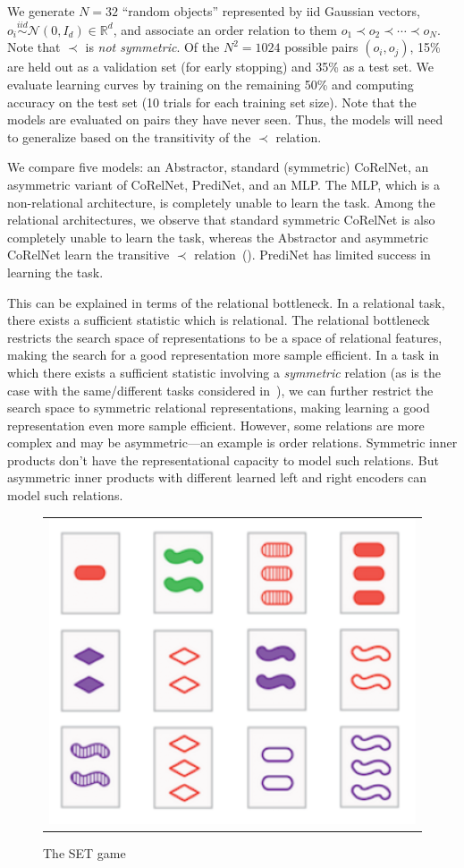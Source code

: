 We generate $N = 32$ ``random objects'' represented by iid Gaussian vectors, $o_i \overset{iid}{\sim} \mathcal{N}(0,
I_d) \in \mathbb{R}^d$, and associate an order relation to them $o_1 \prec o_2 \prec \cdots \prec o_N$. Note that $\prec$ is \textit{not symmetric}. Of the $N^2 = 1024$ possible pairs $(o_i, o_j)$, 15\% are held out as a validation set (for early stopping) and 35\% as a test set. We evaluate learning curves by training on the remaining 50\% and computing accuracy on the test set (10 trials for each training set size). Note that the models are evaluated on pairs they have never seen. Thus, the models will need to generalize based on the transitivity of the $\prec$ relation.

We compare five models: an Abstractor, standard (symmetric) CoRelNet, an asymmetric variant of CoRelNet, PrediNet, and an MLP. The MLP, which is a non-relational architecture, is completely unable to learn the task. Among the relational architectures, we observe that standard symmetric CoRelNet is also completely unable to learn the task, whereas the Abstractor and asymmetric CoRelNet learn the transitive $\prec$ relation~(). PrediNet has limited success in learning the task.

This can be explained in terms of the relational bottleneck. In a relational task, there exists a sufficient statistic which is relational. The relational bottleneck restricts the search space of representations to be a space of relational features, making the search for a good representation more sample efficient. In a task in which there exists a sufficient statistic involving a \textit{symmetric} relation (as is the case with the same/different tasks considered in~\citep{kerg2022neural}), we can further restrict the search space to symmetric relational representations, making learning a good representation even more sample efficient.
However, some relations are more complex and may be asymmetric---an example is order relations. Symmetric inner products don't have the representational capacity to model such relations. But asymmetric inner products with different learned left and right encoders can model such relations.



\begin{figure}
	\vskip-5pt
	\begin{tabular}{c}
		\includegraphics[width=.25\textwidth]{figures/set_example}\\[-5pt]
	\end{tabular}
	\caption{\footnotesize The SET game}\label{fig:set_example}
\end{figure}

